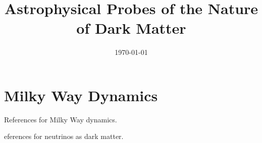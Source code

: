 \documentclass[10pt]{article}
\begin{document}
\title{Astrophysical Probes of the Nature of Dark Matter}
\date{\today}
\maketitle


\section{Milky Way Dynamics}
References for Milky Way dynamics.


\begingroup
\renewcommand{\section}[2]{}%
\endgroup

\section{Neutrinos}
References for neutrinos as dark matter.


\begingroup
\renewcommand{\section}[2]{}%
\endgroup
\end{document}
